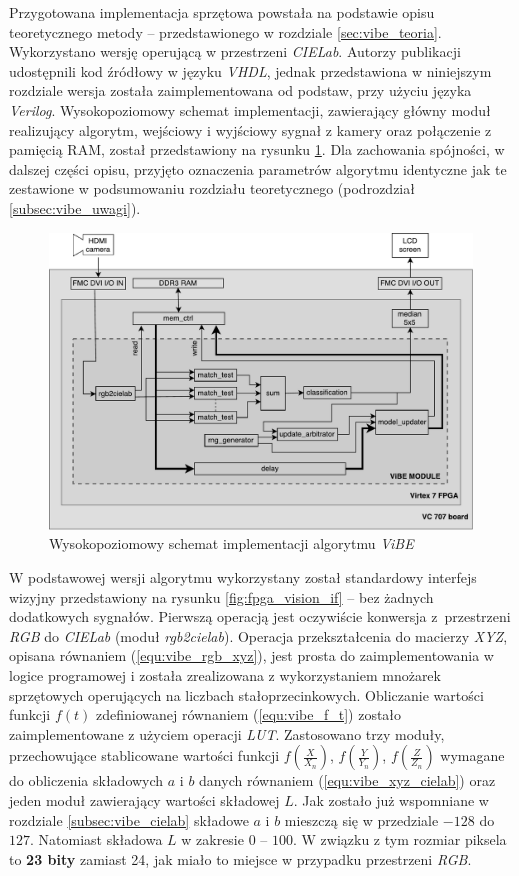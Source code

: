 Przygotowana implementacja sprzętowa powstała na podstawie opisu teoretycznego metody -- przedstawionego w rozdziale \ref{sec:vibe_teoria}. 
Wykorzystano wersję operującą w przestrzeni \textit{CIELab}. 
Autorzy publikacji \cite{kryjak_14_vibe} udostępnili kod źródłowy w języku \textit{VHDL}, jednak przedstawiona w niniejszym rozdziale wersja została zaimplementowana od podstaw, przy użyciu języka \textit{Verilog}.  
Wysokopoziomowy schemat implementacji, zawierający główny moduł realizujący algorytm, wejściowy i wyjściowy sygnał z kamery oraz połączenie z pamięcią RAM, został przedstawiony na rysunku \ref{fig:vibe_diagram}. 
Dla zachowania spójności, w dalszej części opisu, przyjęto oznaczenia parametrów algorytmu identyczne jak te zestawione w podsumowaniu rozdziału teoretycznego (podrozdział \ref{subsec:vibe_uwagi}).

	\begin{figure}[h!]
		\centering
		\includegraphics[scale=0.6]{img/4/vibe.pdf}
		\caption{Wysokopoziomowy schemat implementacji algorytmu \textit{ViBE}}
		\label{fig:vibe_diagram}
	\end{figure}

W podstawowej wersji algorytmu wykorzystany został standardowy interfejs wizyjny przedstawiony na rysunku \ref{fig:fpga_vision_if} -- bez żadnych dodatkowych sygnałów. 
Pierwszą operacją jest oczywiście konwersja z~przestrzeni \textit{RGB} do \textit{CIELab} (moduł \textit{rgb2cielab}). 
Operacja przekształcenia do macierzy \textit{XYZ}, opisana równaniem (\ref{equ:vibe_rgb_xyz}), jest prosta do zaimplementowania w logice programowej i została zrealizowana z wykorzystaniem mnożarek sprzętowych operujących na liczbach stałoprzecinkowych. 
Obliczanie wartości funkcji $f(t)$ zdefiniowanej równaniem (\ref{equ:vibe_f_t}) zostało zaimplementowane z użyciem operacji \textit{LUT}. 
Zastosowano trzy moduły, przechowujące stablicowane wartości funkcji $f(\frac{X}{X_n})$, $f(\frac{Y}{Y_n})$, $f(\frac{Z}{Z_n})$ wymagane do obliczenia składowych $a$ i $b$ danych równaniem (\ref{equ:vibe_xyz_cielab}) oraz jeden moduł zawierający wartości składowej $L$. 
Jak zostało już wspomniane w rozdziale \ref{subsec:vibe_cielab} składowe $a$ i $b$ mieszczą się w przedziale $-128$ do $127$. 
Natomiast składowa $L$ w zakresie $0$ -- $100$. 
W związku z tym rozmiar piksela to \textbf{23 bity} zamiast 24, jak miało to miejsce w przypadku przestrzeni \textit{RGB}.

